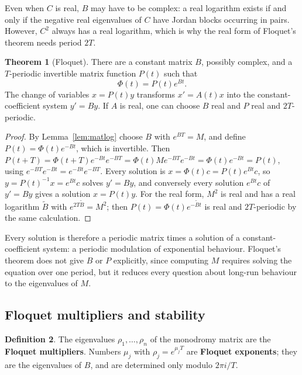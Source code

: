 \documentclass[11pt,a4paper]{article}
\numberwithin{equation}{section}
\theoremstyle{definition}
\newtheorem{thm}{Theorem}[subsection]
\newtheorem{defn}[thm]{Definition}
\begin{document}
Even when $C$ is real, $B$ may have to be complex: a real logarithm exists if and only if the negative real eigenvalues of $C$ have Jordan blocks occurring in pairs. However,
$C^2$ always has a real logarithm, which is why the real form of Floquet's theorem needs period $2T$.

\begin{thm}[Floquet]
\label{thm:floquet}
There are a constant matrix $B$, possibly complex, and a $T$-periodic invertible matrix function $P(t)$ such that
\[
\Phi(t) = P(t)e^{Bt} .
\]
The change of variables $x = P(t)y$ transforms $x' = A(t)x$ into the constant-coefficient system $y' = By$. If $A$ is real, one can choose $B$ real and $P$ real and $2T$-periodic.
\end{thm}

\begin{proof}
By Lemma~\ref{lem:matlog} choose $B$ with $e^{BT} = M$, and define $P(t) = \Phi(t)e^{-Bt}$, which is invertible. Then $P(t + T) = \Phi(t + T)e^{-Bt}e^{-BT} = \Phi(t)Me^{-BT}e^{-Bt} = \Phi(t)e^{-Bt} = P(t)$, using
$e^{-BT}e^{-Bt} = e^{-Bt}e^{-BT}$. Every solution is $x = \Phi(t)c = P(t)e^{Bt}c$, so $y = P(t)^{-1}x = e^{Bt}c$ solves $y' = By$, and conversely every solution $e^{Bt}c$ of $y' = By$ gives a solution $x = P(t)y$. For
the real form, $M^2$ is real and has a real logarithm $\tilde B$ with $e^{2T\tilde B} = M^2$; then $P(t) = \Phi(t)e^{-\tilde Bt}$ is real and $2T$-periodic by the same calculation.
\end{proof}

Every solution is therefore a periodic matrix times a solution of a constant-coefficient system: a periodic modulation of exponential behaviour. Floquet's theorem does not give $B$ or
$P$ explicitly, since computing $M$ requires solving the equation over one period, but it reduces every question about long-run behaviour to the eigenvalues of $M$.

\subsection{Floquet multipliers and stability}
\label{ssec:multipliers}

\begin{defn}
The eigenvalues $\rho_1, \dots, \rho_n$ of the monodromy matrix are the \textbf{Floquet multipliers}. Numbers $\mu_j$ with $\rho_j = e^{\mu_jT}$ are \textbf{Floquet exponents}; they are the eigenvalues of $B$, and are
determined only modulo $2\pi i/T$.
\end{defn}
\end{document}
